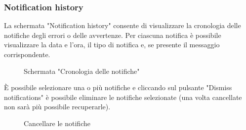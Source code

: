 \subsubsection{Notification history}
La schermata "Notification history" consente di visualizzare la cronologia delle notifiche degli errori o delle avvertenze. Per ciascuna notifica è possibile visualizzare la data e l'ora, il tipo di notifica e, se presente il messaggio corrispondente.
\begin{figure}[H]
    \centering
    \caption{Schermata "Cronologia delle notifiche"}
    \label{fig:my_label}
\end{figure}
È possibile selezionare una o più notifiche e cliccando sul pulsante "Dismiss notifications" è possibile eliminare le notifiche selezionate (una volta cancellate non sarà più possibile recuperarle).
\begin{figure}[H]
    \centering
    \caption{Cancellare le notifiche}
    \label{fig:my_label}
\end{figure}

